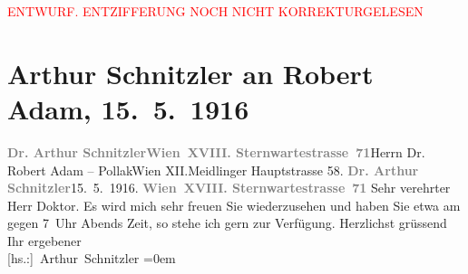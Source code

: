 
\begin{center}
            \textcolor{red}{ENTWURF. ENTZIFFERUNG NOCH NICHT KORREKTURGELESEN}
                      \end{center}
            
               \section[Arthur Schnitzler an Robert Adam, 15. 5. 1916]{ Arthur Schnitzler an Robert Adam, 15. 5. 1916}\nopagebreak{}\rehead{ }\begin{ledgroupsized}[t]{13cm}\normalsize\beginnumbering{} \toendnotes[C]{\smallbreak\pagebreak[2]} 
\toendnotes[C]{\smallbreak}\pstart{}{\pb}\textcolor{gray}{\textbf{Dr. Arthur Schnitzler}}\pend{}\pstart{}\textcolor{gray}{\textbf{Wien XVIII. Sternwartestrasse 71}}\pend{}{\bigskip}\pstart{}{\pb}Herrn Dr. Robert Adam – Pollak\pend{}\pstart{}Wien XII.\pend{}\pstart{}Meidlinger Hauptstrasse 58.\pend{}{\bigskip}\pstart
           \noindent{}{\pb}\textcolor{gray}{\textbf{Dr. Arthur Schnitzler}}\hfill 15. 5. 1916.\pend
           \pstart
           \textcolor{gray}{\textbf{Wien XVIII. Sternwartestrasse 71}}\pend
           \pstart\center{}Sehr verehrter Herr Doktor.\pend\pstart
           Es wird mich sehr freuen Sie wiederzusehen und haben Sie etwa am \label{K_L02227_1v}\label{K_L02227_1h} gegen 7 Uhr Abends Zeit, so
                    stehe ich gern zur Verfügung.\pend
           \pstart
           Herzlichst grüssend{\\[\baselineskip]}Ihr ergebener{\\[\baselineskip]}\spacefill\mbox{{[}hs.:{]} Arthur Schnitzler}\pend
           \leftskip=0em{}\endnumbering{}\end{ledgroupsized}  \newcommand{\dateiname}{L02227}\newcommand{\titel}{Arthur Schnitzler an Robert Adam, 15. 5. 1916}\newcommand{\editorInnen}{Martin Anton Müller und Gerd-Hermann Susen}
      